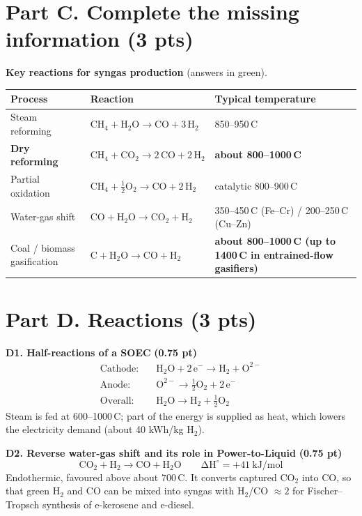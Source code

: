 \documentclass[11pt,a4paper]{article}
\newcommand{\degC}{\,\textdegree C}
\newcommand{\fillin}[1]{\textcolor{ans}{\textbf{#1}}}
\newcommand{\pts}[1]{\hfill{\normalsize\textbf{(#1)}}}
\newcommand{\rxn}[1]{\[\mathrm{#1}\]}
\begin{document}
\section{Part C. Complete the missing information \pts{3 pts}}

\textbf{Key reactions for syngas production} (answers in green).

{\small
\renewcommand{\arraystretch}{1.4}
\begin{tabularx}{\linewidth}{@{}>{\raggedright\arraybackslash}p{3.4cm}>{\raggedright\arraybackslash}p{5.8cm}X@{}}
\toprule
\textbf{Process} & \textbf{Reaction} & \textbf{Typical temperature}\\
\midrule
Steam reforming & \fillin{$\mathrm{CH_4 + H_2O \rightarrow CO + 3\,H_2}$} & 850--950\degC\\
\fillin{Dry reforming} & $\mathrm{CH_4 + CO_2 \rightarrow 2\,CO + 2\,H_2}$ & \fillin{about 800--1000\degC}\\
Partial oxidation & $\mathrm{CH_4 + \tfrac{1}{2}O_2 \rightarrow CO + 2\,H_2}$ & catalytic 800--900\degC\\
Water-gas shift & \fillin{$\mathrm{CO + H_2O \rightarrow CO_2 + H_2}$} & 350--450\degC{} (Fe--Cr) / 200--250\degC{} (Cu--Zn)\\
Coal / biomass gasification & $\mathrm{C + H_2O \rightarrow CO + H_2}$ & \fillin{about 800--1000\degC{} (up to 1400\degC{} in entrained-flow gasifiers)}\\
\bottomrule
\end{tabularx}}

\section{Part D. Reactions \pts{3 pts}}

\textbf{D1. Half-reactions of a SOEC} \pts{0.75 pt}
\begin{align*}
\text{Cathode:}\quad & \mathrm{H_2O + 2\,e^- \longrightarrow H_2 + O^{2-}}\\
\text{Anode:}\quad & \mathrm{O^{2-} \longrightarrow \tfrac{1}{2}O_2 + 2\,e^-}\\
\text{Overall:}\quad & \mathrm{H_2O \longrightarrow H_2 + \tfrac{1}{2}O_2}
\end{align*}
Steam is fed at 600--1000\degC; part of the energy is supplied as heat, which lowers the electricity demand (about
40 kWh/kg H$_2$).

\textbf{D2. Reverse water-gas shift and its role in Power-to-Liquid} \pts{0.75 pt}
\rxn{CO_2 + H_2 \longrightarrow CO + H_2O \qquad \Delta H^\circ = +41\ kJ/mol}
Endothermic, favoured above about 700\degC. It converts captured CO$_2$ into CO, so that green H$_2$ and CO can be
mixed into syngas with H$_2$/CO $\approx 2$ for Fischer--Tropsch synthesis of e-kerosene and e-diesel.
\end{document}
